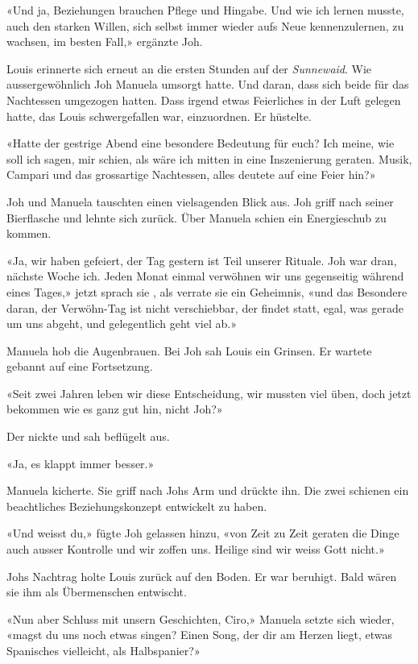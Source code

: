 «Und ja, Beziehungen brauchen Pflege und Hingabe. Und wie ich lernen
musste, auch den starken Willen, sich selbst immer wieder aufs Neue
kennenzulernen, zu wachsen, im besten Fall,» ergänzte Joh.

Louis erinnerte sich erneut an die ersten Stunden auf der \emph{Sunnewaid}. Wie 
aussergewöhnlich Joh Manuela umsorgt hatte. Und daran, dass sich beide
für das Nachtessen umgezogen hatten. Dass irgend etwas Feierliches in
der Luft gelegen hatte, das Louis schwergefallen war, einzuordnen. Er
hüstelte.

«Hatte der gestrige Abend eine besondere Bedeutung für euch? Ich meine,
wie soll ich sagen, mir schien, als wäre ich mitten in eine Inszenierung
geraten. Musik, Campari und das grossartige Nachtessen, alles deutete
auf eine Feier hin?»

Joh und Manuela tauschten einen vielsagenden Blick aus. Joh griff nach
seiner Bierflasche und lehnte sich zurück. 
Über Manuela schien ein Energieschub zu kommen.

«Ja, wir haben gefeiert, der Tag gestern ist Teil unserer Rituale.
Joh war dran, nächste Woche ich. Jeden Monat einmal verwöhnen
wir uns gegenseitig während eines Tages,» jetzt sprach sie , als verrate sie ein Geheimnis, «und das Besondere daran, der Verwöhn-Tag ist nicht verschiebbar, der findet statt, egal, was gerade um uns abgeht, und gelegentlich geht viel ab.»

Manuela hob die Augenbrauen. Bei Joh sah Louis ein Grinsen. Er wartete
gebannt auf eine Fortsetzung. 

«Seit zwei Jahren leben wir diese Entscheidung, wir mussten viel üben,
doch jetzt bekommen wie es ganz gut hin, nicht Joh?»

Der nickte und sah beflügelt aus.

«Ja, es klappt immer besser.»

Manuela kicherte. Sie griff nach Johs Arm und drückte ihn. 
Die zwei schienen ein beachtliches Beziehungskonzept entwickelt zu haben. 

«Und weisst du,» fügte Joh gelassen hinzu, «von Zeit zu Zeit geraten die
Dinge auch ausser Kontrolle und wir zoffen uns. Heilige sind wir weiss
Gott nicht.»

Johs Nachtrag holte Louis zurück auf den Boden. Er war beruhigt. Bald
wären sie ihm als Übermenschen entwischt.

«Nun aber Schluss mit unsern Geschichten, Ciro,» Manuela setzte sich
wieder, «magst du uns noch etwas singen? Einen Song, der dir am Herzen
liegt, etwas Spanisches vielleicht, als Halbspanier?»

